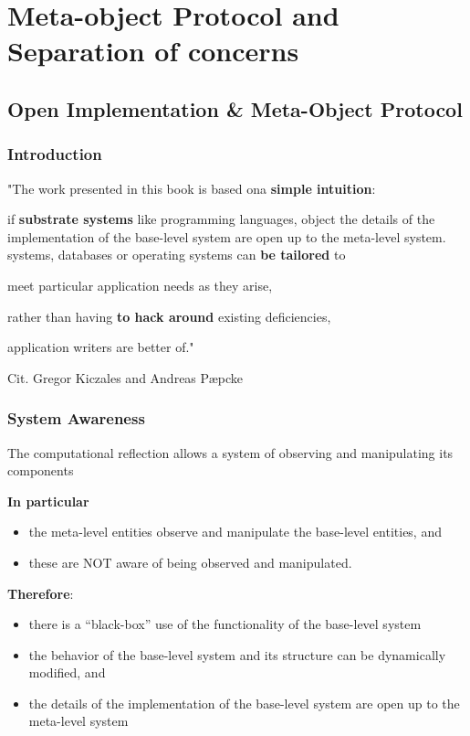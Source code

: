 \section{Meta-object Protocol and Separation of concerns}

\subsection{Open Implementation \& Meta-Object Protocol}

\subsubsection{Introduction}
"The work presented in this book is based ona \textbf{simple intuition}:

if \textbf{substrate systems} like programming languages, object
the details of the implementation of the base-level system are open
up to the meta-level system.
systems, databases or operating systems can \textbf{be tailored} to

meet particular application needs as they arise,

rather than having \textbf{to hack around} existing deficiencies,

application writers are better of."

Cit. Gregor Kiczales and Andreas Pæpcke

\subsubsection{System Awareness}
The computational reflection allows a system of observing and manipulating its components

\textbf{In particular}
\begin{itemize}
	\item the meta-level entities observe and manipulate the base-level entities, and
	\item these are NOT aware of being observed and manipulated.
\end{itemize}

\textbf{Therefore}:
\begin{itemize}
	\item there is a “black-box” use of the functionality of the base-level system
	\item the behavior of the base-level system and its structure can be dynamically modified, and
	\item the details of the implementation of the base-level system are open up to the meta-level system
\end{itemize}

